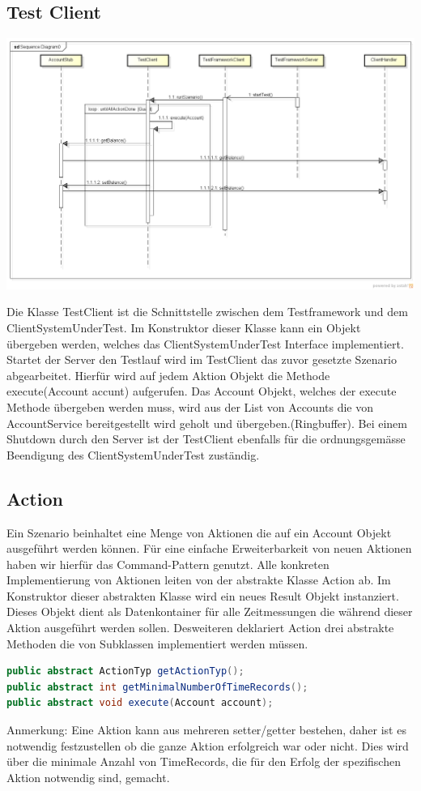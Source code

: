 \subsection{Test Client}
\label{sec:testclient}

\begin{center}
\includegraphics[scale=0.3]{image_testFramework/startTest.png}
\end{center}

Die Klasse TestClient ist die Schnittstelle zwischen dem Testframework und dem ClientSystemUnderTest. Im Konstruktor dieser Klasse kann ein Objekt übergeben werden, welches das ClientSystemUnderTest Interface implementiert. Startet der Server den Testlauf wird im TestClient das zuvor gesetzte Szenario abgearbeitet. Hierfür wird auf jedem Aktion Objekt die Methode execute(Account accunt) aufgerufen. Das Account Objekt, welches der execute Methode übergeben werden muss, wird aus der List von Accounts die von AccountService bereitgestellt wird geholt und übergeben.(Ringbuffer). Bei einem Shutdown durch den Server ist der TestClient ebenfalls für die ordnungsgemässe Beendigung des ClientSystemUnderTest zuständig.

\subsection{Action}
\label{sec:action}
Ein Szenario beinhaltet eine Menge von Aktionen die auf ein Account Objekt ausgeführt werden können. Für eine einfache Erweiterbarkeit von neuen Aktionen haben wir hierfür das Command-Pattern genutzt. Alle konkreten Implementierung von Aktionen leiten von der abstrakte Klasse Action ab. Im Konstruktor  dieser abstrakten Klasse wird ein neues Result Objekt instanziert. Dieses Objekt dient als Datenkontainer für alle Zeitmessungen die während dieser Aktion ausgeführt werden sollen. Desweiteren deklariert Action drei abstrakte Methoden die von Subklassen implementiert werden müssen.
\begin{lstlisting}[language=java, breaklines=true] 	
public abstract ActionTyp getActionTyp();
public abstract int getMinimalNumberOfTimeRecords();
public abstract void execute(Account account);	
\end{lstlisting}
Anmerkung: Eine Aktion kann aus mehreren setter/getter bestehen, daher ist es notwendig festzustellen ob die ganze Aktion erfolgreich war oder nicht. Dies wird über die minimale Anzahl von TimeRecords, die für den Erfolg der spezifischen Aktion notwendig sind, gemacht. 


